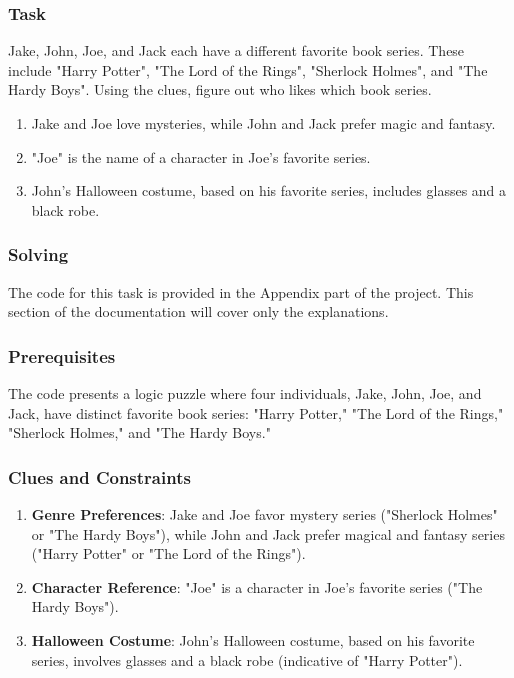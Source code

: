 \documentclass[a4paper,12pt]{report}
\begin{document}
\subsubsection{\Large Task}
Jake, John, Joe, and Jack each have a different favorite book series. These include "Harry Potter", "The Lord of the Rings", "Sherlock Holmes", and "The Hardy Boys". Using the clues, figure out who likes which book series.

\begin{enumerate}
    \item Jake and Joe love mysteries, while John and Jack prefer magic and fantasy.
    \item "Joe" is the name of a character in Joe's favorite series. 
    \item John's Halloween costume, based on his favorite series, includes glasses and a black robe.
\end{enumerate}

\subsubsection{\Large Solving}
The code for this task is provided in the Appendix part of the project. This section of the documentation will cover only the explanations. 
\subsubsection{Prerequisites}
The code presents a logic puzzle where four individuals, Jake, John, Joe, and Jack, have distinct favorite book series: "Harry Potter," "The Lord of the Rings," "Sherlock Holmes," and "The Hardy Boys."

\subsubsection{Clues and Constraints}
\begin{enumerate}
\item  \textbf{Genre Preferences}: Jake and Joe favor mystery series ("Sherlock Holmes" or "The Hardy Boys"), while John and Jack prefer magical and fantasy series ("Harry Potter" or "The Lord of the Rings").
\item \textbf{Character Reference}: "Joe" is a character in Joe's favorite series ("The Hardy Boys").
\item \textbf{Halloween Costume}: John's Halloween costume, based on his favorite series, involves glasses and a black robe (indicative of "Harry Potter").
\end{enumerate}
\end{document}
